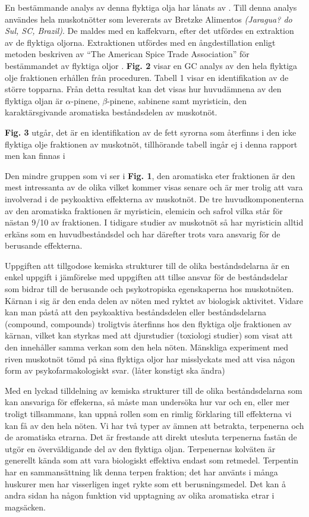 \documentclass[a4paper,margin=3.25cm]{article}
\begin{document}
En bestämmande analys av denna flyktiga olja har lånats av \cite{spricigo1999extraction}.
Till denna analys användes hela muskotnötter som levererats av Bretzke Alimentos \textit{(Jaragua? do Sul, SC, Brazil)}. De maldes med en kaffekvarn, efter det utfördes
en extraktion av de flyktiga oljorna. Extraktionen utfördes med en ångdestillation enligt metoden beskriven av ``The American Spice Trade Association'' för bestämmandet av flyktiga oljor
\cite[citerad av Ferreira]{spricigo1999extraction}.
\textbf{Fig. 2} visar en GC analys av den hela flyktiga olje fraktionen erhållen
från proceduren. Tabell 1 visar en identifikation av de större topparna.
Från detta resultat kan det visas hur huvudämnena av den flyktiga oljan är $\alpha$-pinene, $\beta$-pinene, sabinene samt myristicin, den karaktärsgivande aromatiska beståndsdelen av muskotnöt.

\textbf{Fig. 3} utgår, det är en identifikation av de fett syrorna som återfinns i den icke flyktiga olje fraktionen av muskotnöt, tillhörande tabell ingår ej i denna rapport men kan finnas i \cite[s.258]{spricigo1999extraction}

Den mindre gruppen som vi ser i \textbf{Fig. 1}, den aromatiska
eter fraktionen är den mest intressanta av de olika vilket kommer visas senare
och är mer trolig att vara involverad i de psykoaktiva effekterna av
muskotnöt.
De tre huvudkomponenterna av den aromatiska fraktionen är myristicin, elemicin
och safrol vilka står för nästan 9/10 av fraktionen.
I tidigare studier av muskotnöt så har myristicin alltid erkäns som en
huvudbeståndsdel och har därefter trots vara ansvarig för de berusande effekterna.

Uppgiften att tillgodose kemiska strukturer till de olika beståndsdelarna är
en enkel uppgift i jämförelse med uppgiften att tillse ansvar för de
beståndsdelar som bidrar till de berusande och psykotropiska egenskaperna hos muskotnöten.
Kärnan i sig är den enda delen av nöten med ryktet av biologisk aktivitet.
Vidare kan man påstå att den psykoaktiva beståndsdelen eller beståndsdelarna (compound, compounds)
troligtvis återfinns hos den flyktiga olje fraktionen av kärnan, vilket kan styrkas
med att djurstudier (toxiologi studier) som visat att den innehåller samma
verkan som den hela nöten.
Mänskliga experiment med riven muskotnöt tömd på sina flyktiga oljor har
misslyckats med att visa någon form av psykofarmakologiskt svar. (låter konstigt ska ändra) \cite{truitt}


Med en lyckad tilldelning av kemiska strukturer till de olika beståndsdelarna
som kan ansvariga för effekerna, så måste man undersöka hur var och en, eller
mer troligt tillsammans, kan uppnå rollen som en rimlig förklaring till
effekterna vi kan få av den hela nöten.
Vi har två typer av ämnen att betrakta, terpenerna och de aromatiska etrarna.
Det är frestande att direkt utesluta terpenerna fastän de utgör en överväldigande
del av den flyktiga oljan. Terpenernas kolväten är generellt kända som att vara
biologiskt effektiva endast som retmedel.
Terpentin har en sammansättning lik denna terpen fraktion; det har använts
i många huskurer men har visserligen inget rykte som ett berusningsmedel.
Det kan å andra sidan ha någon funktion vid upptagning av olika aromatiska etrar i
magsäcken.
\end{document}
